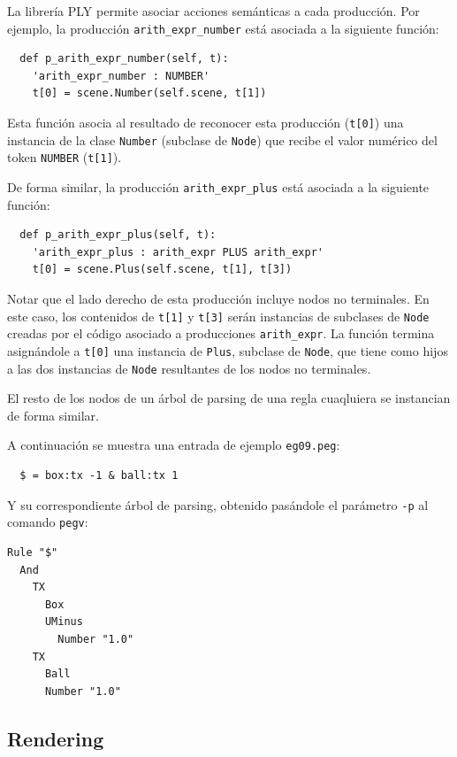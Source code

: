 \documentclass[a4paper, 10pt, twoside]{article}
\begin{document}
La librería PLY permite asociar acciones semánticas a cada producción. Por ejemplo, la producción \texttt{arith\_expr\_number} está asociada a la siguiente función:

\begin{verbatim}
  def p_arith_expr_number(self, t):
    'arith_expr_number : NUMBER'
    t[0] = scene.Number(self.scene, t[1])
\end{verbatim}

Esta función asocia al resultado de reconocer esta producción (\texttt{t[0]}) una instancia de la clase \texttt{Number} (subclase de \texttt{Node}) que recibe el valor numérico del token \texttt{NUMBER} (\texttt{t[1]}).

De forma similar, la producción \texttt{arith\_expr\_plus} está asociada a la siguiente función:

\begin{verbatim}
  def p_arith_expr_plus(self, t):
    'arith_expr_plus : arith_expr PLUS arith_expr'
    t[0] = scene.Plus(self.scene, t[1], t[3])
\end{verbatim}

Notar que el lado derecho de esta producción incluye nodos no terminales. En este caso, los contenidos de \texttt{t[1]} y \texttt{t[3]} serán instancias de subclases de \texttt{Node} creadas por el código asociado a producciones \texttt{arith\_expr}. La función termina asignándole a \texttt{t[0]} una instancia de \texttt{Plus}, subclase de \texttt{Node}, que tiene como hijos a las dos instancias de \texttt{Node} resultantes de los nodos no terminales.

El resto de los nodos de un árbol de parsing de una regla cuaqluiera se instancian de forma similar.

A continuación se muestra una entrada de ejemplo \texttt{eg09.peg}:

\begin{verbatim}
  $ = box:tx -1 & ball:tx 1
\end{verbatim}

Y su correspondiente árbol de parsing, obtenido pasándole el parámetro \texttt{-p} al comando \texttt{pegv}:

\begin{verbatim}
Rule "$"
  And
    TX
      Box
      UMinus
        Number "1.0"
    TX
      Ball
      Number "1.0"
\end{verbatim}


\subsection{Rendering}
\end{document}
